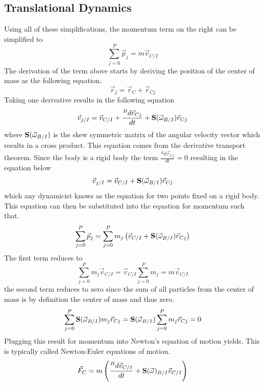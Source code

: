 \documentclass{article}
\begin{document}
\subsection{Translational Dynamics}

Using all of these simplifications, the momentum term on the right can
be simplified to 
\begin{equation}
\sum\limits_{j=0}^P \vec{p}_j = m \vec{v}_{C/I}
\end{equation}
The derivation of the term above starts by deriving the position of
the center of mass as the following equation.
\begin{equation}
\vec{r}_{j} = \vec{r}_C + \vec{r}_{Cj}
\end{equation}
Taking one derivative results in the following equation
\begin{equation}
\vec{v}_{j/I} = \vec{v}_{C/I} + \frac{{}^Bd \vec{r}_{Cj}}{dt} +
{\bf S}(\vec{\omega}_{B/I}) \vec{r}_{Cj}
\end{equation}
where ${\bf S}(\vec{\omega}_{B/I})$ is the skew symmetric matrix of the
angular velocity vector which results in a cross product. This
equation comes from the derivative transport theorem. Since the body
is a rigid body the term $\frac{{}^Bd \vec{r}_{Cj}}{dt}=0$ resulting
in the equation below
\begin{equation}
\vec{v}_{j/I} = \vec{v}_{C/I} + {\bf S}(\vec{\omega}_{B/I}) \vec{r}_{Cj}
\end{equation}
which any dynamicist knows as the equation for two points fixed on a
rigid body. This equation can then be substituted into the equation
for momentum such that.
\begin{equation}
\sum\limits_{j=0}^P \vec{p}_j =  \sum\limits_{j=0}^P m_j \left(\vec{v}_{C/I}
+ {\bf S}(\vec{\omega}_{B/I}) \vec{r}_{Cj}\right)
\end{equation}
The first term reduces to 
\begin{equation}
\sum\limits_{j=0}^P m_j \vec{v}_{C/I} =  \vec{v}_{C/I}
\sum\limits_{j=0}^P m_j =  m \vec{v}_{C/I} 
\end{equation}
the second term reduces to zero since the sum of all particles from
the center of mass is by definition the center of mass and thus zero.
\begin{equation}
\sum\limits_{j=0}^P {\bf S}(\vec{\omega}_{B/I}) m_j\vec{r}_{Cj} =
{\bf S}(\vec{\omega}_{B/I})\sum\limits_{j=0}^P m_j\vec{r}_{Cj} = 0
\end{equation}
Plugging this result for momentum into Newton's equation of motion
yields. This is typically called Newton-Euler equations of motion.
\begin{equation}
\vec{F}_C = m \left(\frac{{}^Bd \vec{v}_{C/I}}{dt} +
{\bf S}(\vec{\omega})_{B/I} \vec{v}_{C/I} \right)
\end{equation}
\end{document}
